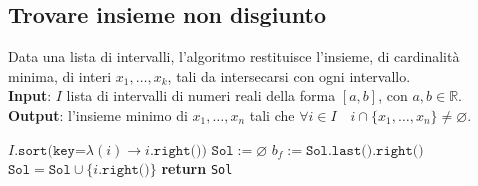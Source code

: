 \documentclass[14pt]{extreport}
\theoremstyle{definition}
\theoremstyle{definition}
\begin{document}
\subsection{Trovare insieme non disgiunto}

\begin{algorithm}[H]
    \caption{
        Data una lista di intervalli, l'algoritmo restituisce l'insieme, di cardinalità minima, di interi $x_1, \ldots, x_k$, tali da intersecarsi con ogni intervallo.\\
        \textbf{Input}: $I$ lista di intervalli di numeri reali della forma $[a, b]$, con $a, b \in \mathbb{R}$.\\
        \textbf{Output}: l'insieme minimo di $x_1, \ldots, x_n$ tali che $\forall i \in I \quad i \cap \{x_1, \ldots, x_n\} \neq \varnothing$.
    }

    \begin{algorithmic}[1]
            \State $I\texttt{.sort(key=}\lambda (i) \rightarrow i\texttt{.right())}$ 
            \State $\texttt{Sol}:= \varnothing$
                \State $b_f := \texttt{Sol.last().right()}$ 
                 
                    \State $\texttt{Sol} = \texttt{Sol} \cup \{i\texttt{.right()}\}$
                \EndIf
            \EndFor
            \State \textbf{return} \texttt{Sol}
        \EndFunction
    \end{algorithmic}
\end{algorithm}
\end{document}
